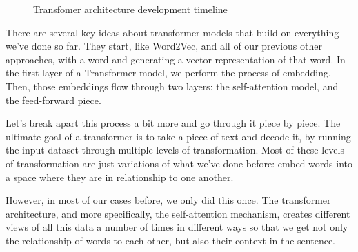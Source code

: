 \documentclass[11pt]{diazessay} %
\begin{document}
\begin{figure}[!ht]
        \caption{Transfomer architecture development timeline\citep{amatriain2023transformer}}
      \end{figure}

There are several key ideas about transformer models that build on everything we've done so far. They start, like Word2Vec, and all of our previous other approaches, with a word and generating a vector representation of that word. In the first layer of a Transformer model, we perform the process of embedding. Then, those embeddings flow through two layers: the self-attention model, and the feed-forward piece. 

Let's break apart this process a bit more and go through it piece by piece. The ultimate goal of a transformer is to take a piece of text and decode it, by running the input dataset through multiple levels of transformation. Most of these levels of transformation are just variations of what we've done before: embed words into a space where they are in relationship to one another. 

However, in most of our cases before, we only did this once. The transformer architecture, and more specifically, the self-attention mechanism, creates different views of all this data a number of times in different ways so that we get not only the relationship of words to each other, but also their context in the sentence. 
\end{document}

